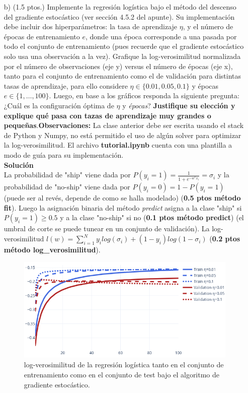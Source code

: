 \documentclass[11pt,letterpaper]{article}
\begin{document}
\begin{enumerate}
\item[b)] (1.5 ptos.) Implemente la regresión logística bajo el método del descenso del gradiente estocástico (ver sección 4.5.2 del apunte). Su implementación debe incluir dos hiperparámetros:  la tasa de aprendizaje $\eta$, y el número de épocas de entrenamiento $e$, donde una época corresponde a una pasada por todo el conjunto de entrenamiento (pues recuerde que el gradiente estocástico solo usa una observación a la vez). Grafique la log-verosimilitud normalizada por el número de observaciones (eje y) versus el número de épocas (eje x), tanto para el conjunto de entrenamiento como el de validación para distintas tasas de aprendizaje, para ello considere $\eta \in  \{0.01, 0.05, 0.1\}$ y {épocas} $e\in \{1,\ldots, 100\}$. Luego, en base a los gráficos responda la siguiente pregunta:
¿Cuál es la configuración óptima de $\eta$ y \textit{épocas}? \textbf{Justifique su elección y explique qué pasa con tazas de aprendizaje muy grandes o pequeñas}.\textbf{Observaciones:} La clase anterior debe ser escrita usando el stack de Python y Numpy, no está permitido el uso de algún solver para optimizar la log-verosimilitud. El archivo \textbf{tutorial.ipynb} cuenta con una plantilla a modo de guía para su implementación.\\

\textbf{Solución}\\

La probabilidad de "ship" viene dada por $P(y_{i}=1) = \frac{1}{1+e^{-w^{T}x_{i}}}=\sigma_{i}$ y la probabilidad de "no-ship" viene dada por $P(y_{i}=0) = 1-P(y_{i}=1)$ (puede ser al revés, depende de como se halla modelado) (\textbf{0.5 ptos método fit}). Luego la asignación binaria del método \textit{predict} asigna a la clase "ship" si $P(y_{i}=1)\geq 0.5$ y a la clase "no-ship" si no (\textbf{0.1 ptos método predict}) (el umbral de corte se puede tunear en un conjunto de validación). La log-verosimilitud $ l(w) = \sum_{i=1}^{N}y_{i}log(\sigma_{i})+(1-y_{i})log(1-\sigma_{i})$ (\textbf{0.2 ptos método log\_verosimilitud}).

\begin{figure}[H]
    \center
    \includegraphics[scale=0.62]{img/log_likelihood.png}
    \caption{log-verosimilitud de la regresión logística tanto en el conjunto de entrenamiento como en el conjunto de test bajo el algoritmo de gradiente estocástico.}
\end{figure}


\end{enumerate}
\end{document}
